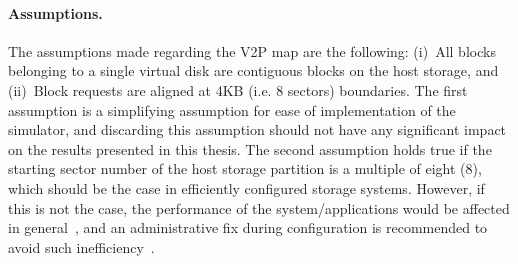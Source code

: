 
\paragraph{Assumptions.} The assumptions made regarding the V2P map are
the following:
(i)~All blocks belonging to a single virtual disk are contiguous blocks on
the host storage, and
(ii)~Block requests are aligned at 4KB (i.e. 8 sectors) boundaries.
The first assumption is a simplifying assumption
for ease of implementation of the simulator, and discarding this assumption
should not have any significant impact on the results presented in this thesis.
The second assumption holds true if the 
starting sector number of the host storage partition is a multiple of eight (8),
which should be the case in efficiently configured storage systems.
However, if this is not the case, 
the performance of the system/applications would be affected in general~\cite{virt-alignment-scan},
and an administrative fix during configuration is recommended to avoid
such inefficiency~\cite{netapp-alignment, oracle-alignment}.

